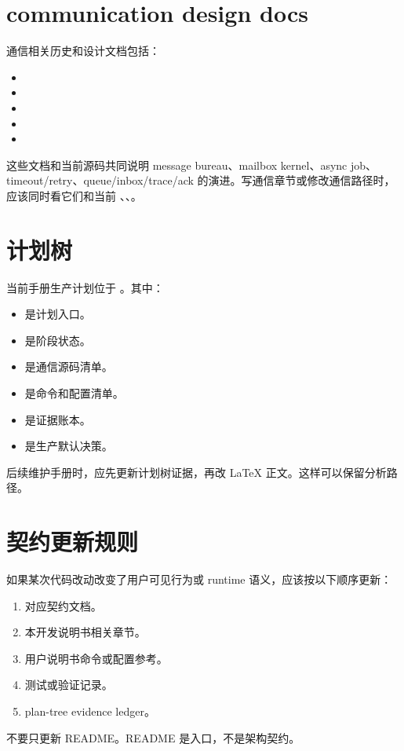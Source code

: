 \section{communication design docs}

通信相关历史和设计文档包括：

\begin{itemize}
  \item {}
  \item {}
  \item {}
  \item {}
  \item {}
\end{itemize}

这些文档和当前源码共同说明 message bureau、mailbox kernel、async job、timeout/retry、queue/inbox/trace/ack 的演进。写通信章节或修改通信路径时，应该同时看它们和当前 、、。

\section{计划树}

当前手册生产计划位于 。其中：

\begin{itemize}
  \item {} 是计划入口。
  \item {} 是阶段状态。
  \item {} 是通信源码清单。
  \item {} 是命令和配置清单。
  \item {} 是证据账本。
  \item {} 是生产默认决策。
\end{itemize}

后续维护手册时，应先更新计划树证据，再改 LaTeX 正文。这样可以保留分析路径。

\section{契约更新规则}

如果某次代码改动改变了用户可见行为或 runtime 语义，应该按以下顺序更新：

\begin{enumerate}
  \item 对应契约文档。
  \item 本开发说明书相关章节。
  \item 用户说明书命令或配置参考。
  \item 测试或验证记录。
  \item plan-tree evidence ledger。
\end{enumerate}

不要只更新 README。README 是入口，不是架构契约。

